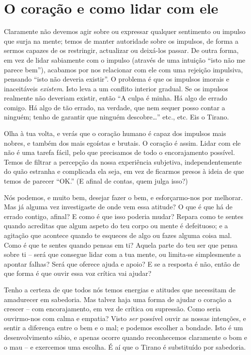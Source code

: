 \section{O coração e como lidar com
ele}

Claramente não devemos agir sobre ou expressar qualquer sentimento ou
impulso que surja na mente; temos de manter autoridade sobre os
impulsos, de forma a sermos capazes de os restringir, actualizar ou
deixá-los passar. De outra forma, em vez de lidar sabiamente com o
impulso (através de uma intuição “isto não me parece bem”), acabamos por
nos relacionar com ele com uma rejeição impulsiva, pensando “isto não
deveria existir”. O problema é que os impulsos imorais e inaceitáveis
\emph{existem}. Isto leva a um conflito interior gradual. Se os impulsos
realmente não deveriam existir, então “A culpa é minha. Há algo de
errado comigo. Há algo de tão errado, na verdade, que nem sequer posso
contar a ninguém; tenho de garantir que ninguém descobre\ldots{}” etc., etc.
Eis o Tirano.

Olha à tua volta, e verás que o coração humano é capaz dos impulsos mais
nobres, e também dos mais egoístas e brutais. O coração é assim. Lidar
com ele não é uma tarefa fácil, pelo que precisamos de todo o
encorajamento possível. Temos de filtrar a percepção da nossa
experiência subjetiva, independentemente do quão estranha e complicada
ela seja, em vez de ficarmos presos à ideia de que temos de parecer
“OK.” (E afinal de contas, quem julga isso?)

Nós podemos, e muito bem, desejar fazer o bem, e esforçarmo-nos por
melhorar. Mas já alguma vez investigaste de onde vem essa atitude? O que
é que há de errado contigo, afinal? E como é que isso poderia mudar?
Repara como te sentes quando acreditas que algum aspeto do teu corpo ou
mente é defeituoso; e a agitação que acontece quando te esqueces de algo
ou fazes alguma coisa mal. Como é que te sentes quando pensas em ti?
Aquela parte do teu ser que pensa sobre ti -- será que consegue lidar
com a tua mente, ou limita-se simplesmente a apontar falhas? Será que
oferece ajuda e apoio? E se a resposta é não, então de que forma é que
ouvir essa voz crítica vai ajudar?

\sectionBreak

Tenho a certeza de que todos nós temos energias e atitudes que
necessitam de amadurecer em sabedoria. Mas talvez haja uma forma de
ajudar o coração a crescer -- com encorajamento, em vez de crítica ou
supressão. Como seria ouvirmo-nos com calma e empatia? Visto \emph{ser}
possível ouvir as nossas intenções, e sentir a diferença entre o bem e o
mal; e podemos escolher a bondade. Isto é um desenvolvimento sábio, e
apenas ocorre quando reconhecemos claramente o bom e o mau -- e
exercemos uma escolha. É aí que o Tirano é substituído por sabedoria.

